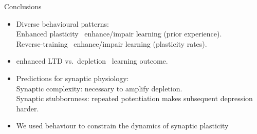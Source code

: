 \documentclass{beamer}%
\begin{document}
\begin{frame}{Conclusions}
%
 \begin{itemize}
   \item Diverse behavioural patterns:\\
   \alert{Enhanced plasticity \lto\ enhance/impair} learning (prior experience).\\
   \alert{Reverse-training \lto\ enhance/impair} learning (plasticity rates).

   \item \alert{enhanced LTD} vs.\ \alert{depletion} \lto\ learning outcome.
    \hfill{} {}



   \item Predictions for synaptic physiology:\\
   \alert{Synaptic complexity:} necessary to amplify depletion.\\
   \alert{Synaptic stubbornness:} repeated potentiation makes subsequent depression harder.

   \vp\item  We used behaviour to constrain the dynamics of synaptic plasticity
\end{itemize}
%
\end{frame}
\end{document}

